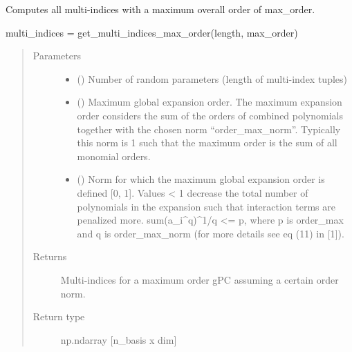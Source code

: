 \documentclass[letterpaper,10pt,english,openany,oneside]{sphinxmanual}
\begin{document}
\begin{fulllineitems}
\label{\detokenize{pygpc:pygpc.misc.get_multi_indices}}
Computes all multi-indices with a maximum overall order of max\_order.

multi\_indices = get\_multi\_indices\_max\_order(length, max\_order)
\begin{quote}\begin{description}
\item[{Parameters}] \leavevmode\begin{itemize}
\item {} 
 () \textendash{} Number of random parameters (length of multi-index tuples)

\item {} 
 () \textendash{} Maximum global expansion order.
The maximum expansion order considers the sum of the orders of combined polynomials together with the
chosen norm “order\_max\_norm”. Typically this norm is 1 such that the maximum order is the sum of all
monomial orders.

\item {} 
 () \textendash{} Norm for which the maximum global expansion order is defined {[}0, 1{]}. Values \textless{} 1 decrease the total number
of polynomials in the expansion such that interaction terms are penalized more.
sum(a\_i\textasciicircum{}q)\textasciicircum{}1/q \textless{}= p, where p is order\_max and q is order\_max\_norm (for more details see eq (11) in {[}1{]}).

\end{itemize}

\item[{Returns}] \leavevmode
{} \textendash{} Multi-indices for a maximum order gPC assuming a certain order norm.

\item[{Return type}] \leavevmode
np.ndarray {[}n\_basis x dim{]}

\end{description}\end{quote}

\end{fulllineitems}
\end{document}
